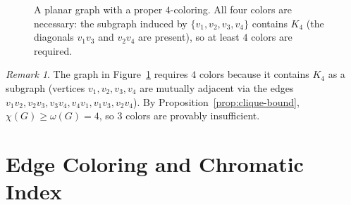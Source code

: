 \documentclass[12pt,a4paper]{article}
\theoremstyle{definition}
\theoremstyle{plain}
\theoremstyle{remark}
\newtheorem{remark}{Remark}[section]
\begin{document}
\begin{figure}[htbp]
  \centering
  \caption{A planar graph with a proper $4$-coloring.  All four colors are
           necessary: the subgraph induced by $\{v_1,v_2,v_3,v_4\}$ contains
           $K_4$ (the diagonals $v_1v_3$ and $v_2v_4$ are present), so at
           least $4$ colors are required.}
  \label{fig:4-coloring}
\end{figure}

\begin{remark}\label{rem:3-insufficient}
  The graph in Figure~\ref{fig:4-coloring} requires $4$ colors because it
  contains $K_4$ as a subgraph (vertices $v_1, v_2, v_3, v_4$ are mutually
  adjacent via the edges $v_1v_2, v_2v_3, v_3v_4, v_4v_1, v_1v_3, v_2v_4$).
  By Proposition~\ref{prop:clique-bound}, $\chi(G) \geq \omega(G) = 4$, so
  $3$ colors are provably insufficient.
\end{remark}

\section{Edge Coloring and Chromatic Index}
\label{sec:edge-coloring}
\end{document}
